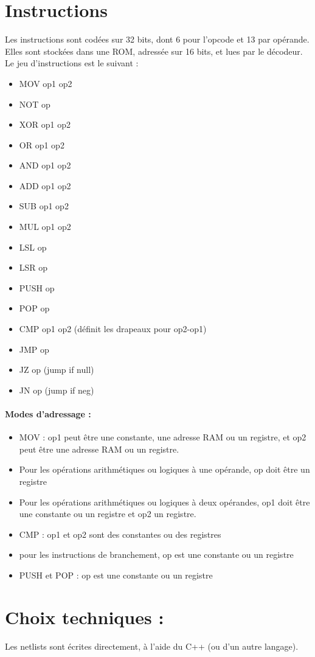 \documentclass{article}
\begin{document}
    \section{Instructions}
    Les instructions sont codées sur 32 bits, dont 6 pour l'opcode et 13 par opérande. Elles sont stockées dans une
    ROM, adressée sur 16 bits, et lues par le décodeur. Le jeu d'instructions est le suivant :
    \begin{multicols}{2}
        \begin{itemize}
            \item MOV op1 op2
            \item NOT op
            \item XOR op1 op2
            \item OR op1 op2
            \item AND op1 op2
            \item ADD op1 op2
            \item SUB op1 op2
            \item MUL op1 op2
            \item LSL op
            \item LSR op
            \item PUSH op
            \item POP op
            \item CMP op1 op2 (définit les drapeaux pour op2-op1)
            \item JMP op
            \item JZ op (jump if null)
            \item JN op (jump if neg)
        \end{itemize}
    \end{multicols}
    \paragraph{Modes d'adressage :}
    \begin{itemize}
        \item MOV : op1 peut être une constante, une adresse RAM
ou un registre, et op2 peut être une adresse RAM ou un registre.
        \item Pour les opérations arithmétiques ou logiques à une opérande, op doit être un registre
        \item Pour les opérations arithmétiques ou logiques à deux opérandes, op1 doit être une constante ou un registre
et op2 un registre.
        \item CMP : op1 et op2 sont des constantes ou des registres
        \item pour les instructions de branchement, op est une constante ou un registre
        \item PUSH et POP : op est une constante ou un registre
    \end{itemize}

    \section{Choix techniques :}
    Les netlists sont écrites directement, à l'aide du C++ (ou d'un autre langage).
\end{document}

